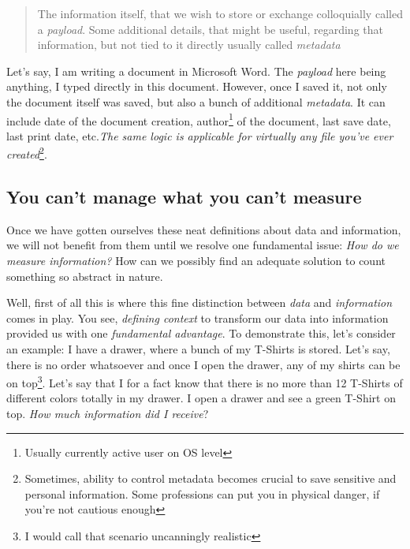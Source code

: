 \documentclass{article}
\begin{document}
            \begin{quote}
                The information itself, that we wish to store or exchange colloquially called a \emph{payload}. Some additional details, that might be useful, regarding
                that information, but not tied to it directly usually called \emph{metadata}
            \end{quote}

            Let's say, I am writing a document in Microsoft Word. The \emph{payload} here being anything, I typed directly in this document. However, once I saved it, not
            only the document itself was saved, but also a bunch of additional \emph{metadata}. It can include date of the document creation, 
            author\footnote{Usually currently active user on OS level} of the document, last save date, last print date, etc.\emph{The same logic is applicable for virtually
            any file you've ever created}\footnote{Sometimes, ability to control metadata becomes crucial to save sensitive and personal information. 
            Some professions can put you in physical danger, if you're not cautious enough}.\par

            \newpage
        \subsection{You can't manage what you can't measure}
            Once we have gotten ourselves these neat definitions about data and information, we will not benefit from them until we resolve one fundamental issue:
            \emph{How do we measure information?} How can we possibly find an adequate solution to count something so abstract in nature. \par 

            Well, first of all this is where this fine distinction between \emph{data} and \emph{information} comes in play. You see, \emph{defining context} to transform
            our data into information provided us with one \emph{fundamental advantage}. To demonstrate this, let's consider an example: I have a drawer, where a bunch
            of my T-Shirts is stored. Let's say, there is no order whatsoever and once I open the drawer, any of my shirts can be on top\footnote{I would call
            that scenario uncanningly realistic}. Let's say that I for a fact know that there is no more than 12 T-Shirts of different colors totally in my drawer.
            I open a drawer and see a green T-Shirt on top. \emph{How much information did I receive}? \par
\end{document}
